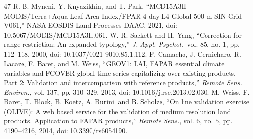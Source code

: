 \documentclass[a4paper,fleqn]{cas-dc}
\begin{document}
\begin{thebibliography}{47}
 R. B. Myneni, Y. Knyazikhin, and T. Park, ``MCD15A3H MODIS/Terra+Aqua Leaf Area Index/FPAR 4-day L4 Global 500 m SIN Grid V061,'' NASA EOSDIS Land Processes DAAC, 2021, doi: 10.5067/MODIS/MCD15A3H.061.
 W. R. Sackett and H. Yang, ``Correction for range restriction: An expanded typology,'' \textit{J. Appl. Psychol.}, vol. 85, no. 1, pp. 112--118, 2000, doi: 10.1037/0021-9010.85.1.112.
 F. Camacho, J. Cernicharo, R. Lacaze, F. Baret, and M. Weiss, ``GEOV1: LAI, FAPAR essential climate variables and FCOVER global time series capitalizing over existing products. Part 2: Validation and intercomparison with reference products,'' \textit{Remote Sens. Environ.}, vol. 137, pp. 310--329, 2013, doi: 10.1016/j.rse.2013.02.030.
 M. Weiss, F. Baret, T. Block, B. Koetz, A. Burini, and B. Scholze, ``On line validation exercise (OLIVE): A web based service for the validation of medium resolution land products. Application to FAPAR products,'' \textit{Remote Sens.}, vol. 6, no. 5, pp. 4190--4216, 2014, doi: 10.3390/rs6054190.
\end{thebibliography}
\end{document}
